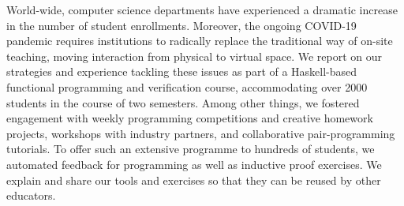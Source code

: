 World-wide, computer science departments have experienced a dramatic increase in the number of student enrollments.
Moreover, the ongoing COVID-19 pandemic requires institutions to radically replace the traditional way of on-site teaching,
moving interaction from physical to virtual space.
We report on our strategies and experience tackling these issues
as part of a Haskell-based functional programming and verification course,
accommodating over 2000 students in the course of two semesters.
Among other things,
we fostered engagement with weekly programming competitions
and creative homework projects,
workshops with industry partners,
and collaborative pair-programming tutorials.
To offer such an extensive programme to hundreds of students,
we automated feedback for programming as well as
inductive proof exercises.
We explain and share our tools and exercises so that they can be reused by other educators.

